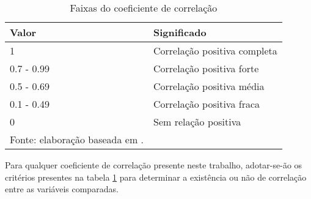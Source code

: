 \begin{table}[H]
\caption{Faixas do coeficiente de correlação}
\begin{tabular}{@{}ll@{}}
\toprule
Valor      & Significado                  \\ \midrule
1          & Correlação positiva completa \\ \midrule
0.7 - 0.99 & Correlação positiva forte    \\ \midrule
0.5 - 0.69 & Correlação positiva média    \\ \midrule
0.1 - 0.49 & Correlação positiva fraca    \\ \midrule
0          & Sem relação positiva  \\ \midrule      
\label{tab:faixas-coeficiente-correlacao}
\footnotesize{Fonte: elaboração baseada em \cite{ali2022spearman}.}  
\end{tabular}
\end{table}

Para qualquer coeficiente de correlação presente neste trabalho, adotar-se-ão os critérios presentes na tabela \ref{tab:faixas-coeficiente-correlacao} para determinar a existência ou não de correlação entre as variáveis comparadas.

